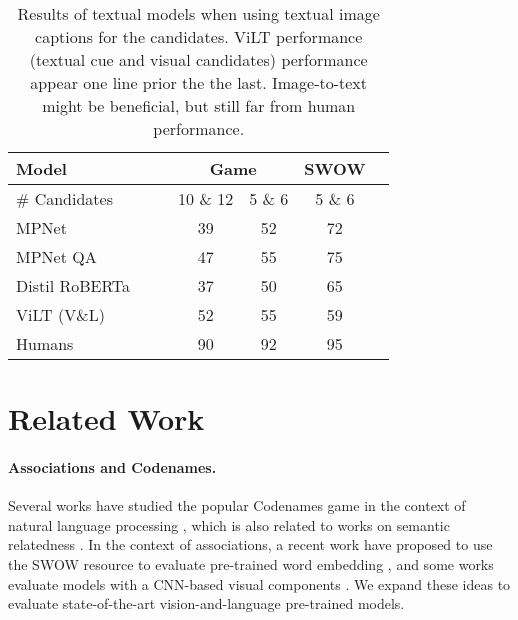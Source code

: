\documentclass{article}
\begin{document}
\begin{wraptable}{R}{0.55\textwidth}
\centering
\caption{Results of textual models when using textual image captions for the candidates. ViLT performance (textual cue and visual candidates) performance appear one line prior the the last. Image-to-text might be beneficial, but still far from human performance.}
\label{tab:image_captions} 
\begin{tabular}{@{}lcccccc@{}} \toprule
 Model &  
                                      &                                   & \multicolumn{2}{c}{Game}      & SWOW        \\ \midrule
                                      \# Candidates &  
                                      &                                   & 10 \& 12            & 5 \& 6      & 5 \& 6                \\
                                      \midrule

                                     MPNet          &                       &                                   & 39 &     52        &   72          \\
                                                                          MPNet QA          &                       &                                   &     47 & 55        &   75          \\

                                      Distil RoBERTa          &                       &                                   &     37 & 50        &   65          
\\ \midrule
 ViLT (V\&L)                  &                       &                                  & 52 & 55          & 59\\ 
 Humans                  &                       &                                  & 90 & 92          & 95
 \\ \bottomrule         
\end{tabular}
\end{wraptable}
  

 
\section{Related Work}
\paragraph{Associations and Codenames.} Several works have studied the popular Codenames game in the context of natural language processing \cite{shen2018comparing,kim2019cooperation}, which is also related to works on semantic relatedness \cite{gabrilovich2007computing,strube2006wikirelate,budanitsky2006evaluating,hassan2011semantic}. In the context of associations, a recent work have proposed to use the SWOW resource to evaluate pre-trained word embedding \cite{thawani2019swow}, and some works evaluate models with a CNN-based visual components \cite{de2018visual,de2021visual}. We expand these ideas to evaluate state-of-the-art vision-and-language pre-trained models.
\end{document}
